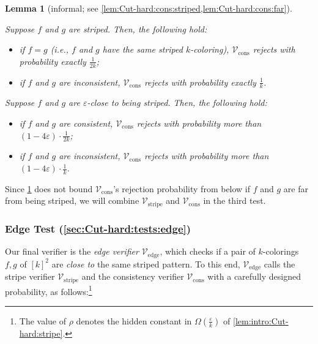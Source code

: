 \documentclass[11pt,fleqn]{article}
\renewcommand{\epsilon}{\varepsilon}
\newcommand{\V}{\calV}
\newcommand{\f}{f}
\newcommand{\g}{g}
\newcommand{\Vstripe}{\V_\mathrm{stripe}}
\newcommand{\Vcons}{\V_\mathrm{cons}}
\newcommand{\Vedge}{\V_\mathrm{edge}}
\newcommand{\calV}{\mathcal{V}}
\newtheorem{lemma}[theorem]{Lemma}
\theoremstyle{definition}
\numberwithin{equation}{section}
\begin{document}
\begin{lemma}[informal;  see \cref{lem:Cut-hard:cons:striped,lem:Cut-hard:cons:far}]
\label{lem:intro:Cut-hard:cons}
\mbox{}

    Suppose $\f$ and $\g$ are striped.
    Then, the following hold\textup{:}
    \begin{itemize}
        \item if $\f = \g$
            (i.e., $\f$ and $\g$ have the same striped $k$-coloring),
            $\Vcons$ rejects 
            with probability exactly $\frac{1}{2k}$\textup{;}
        \item if $\f$ and $\g$ are inconsistent,
            $\Vcons$ rejects 
            with probability exactly $\frac{1}{k}$.
    \end{itemize}

    Suppose $\f$ and $\g$ are $\epsilon$-close to being striped.
    Then, the following hold\textup{:}
    \begin{itemize}
    \item if $\f$ and $\g$ are consistent,
        $\Vcons$ rejects 
        with probability more than
        $( 1-4 \epsilon ) \cdot \frac{1}{2k}$\textup{;}
    \item if $\f$ and $\g$ are inconsistent,
        $\Vcons$ rejects 
        with probability more than
        $( 1-4 \epsilon ) \cdot \frac{1}{k}$.
    \end{itemize}
\end{lemma}


Since \cref{lem:intro:Cut-hard:cons} does not bound $\Vcons$'s rejection probability from below
if $\f$ and $\g$ are far from being striped,
we will combine $\Vstripe$ and $\Vcons$ in the third test.


\subsubsection{Edge Test (\cref{sec:Cut-hard:tests:edge})}
Our final verifier is the \emph{edge verifier} $\Vedge$,
which checks if a pair of $k$-colorings $\f,\g$ of $[k]^2$ are \emph{close to} the same striped pattern.
To this end, $\Vedge$ calls the stripe verifier $\Vstripe$ and the consistency verifier $\Vcons$
with a carefully designed probability, as follows:\footnote{
The value of $\rho$ denotes the hidden constant in $\Omega\left(\frac{\epsilon}{k}\right)$ of \cref{lem:intro:Cut-hard:stripe}.
}
\end{document}
